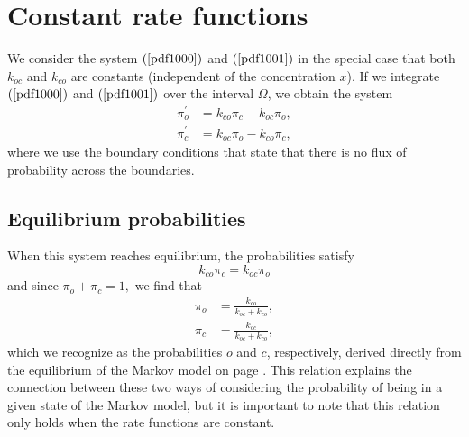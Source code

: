 \section{Constant rate functions}
We consider the system $\left(  \ref{pdf1000}\right)$ and $\left(\ref{pdf1001}\right)  $ in the
special case that both $k_{oc}$ and $k_{co}$ are constants (independent of the concentration $x$). If we integrate
$\left(  \ref{pdf1000}\right)$ and $\left(\ref{pdf1001}\right)  $ over the interval $\Omega$, we obtain the system%
\begin{align}
\pi_{o}^{\prime}  &  =k_{co}\pi_{c}-k_{oc}\pi_{o},\label{pi1}\\
\pi_{c}^{\prime}  &  =k_{oc}\pi_{o}-k_{co}\pi_{c}, \label{pi2}%
\end{align}
where we use the boundary conditions that state that there is no flux
of probability across the boundaries.

\subsection{Equilibrium probabilities}


When this system reaches equilibrium, the probabilities satisfy
\begin{equation}
k_{co}\pi_{c}=k_{oc}\pi_{o}%
\end{equation}
and since $\pi_{o}+\pi_{c}=1,$ we find that%
\begin{align}
\pi_{o} &  =\frac{k_{co}}{k_{oc}+k_{co}},\label{eq_po}\\
\pi_{c} &  =\frac{k_{oc}}{k_{oc}+k_{co}},\label{eq_pc}%
\end{align}
which we recognize as the probabilities $o$ and $c$, respectively, derived directly from the
equilibrium of the Markov model on page \pageref{eq_pr_wt}. This relation explains
the connection between these two ways of considering the probability of
being in a given state of the Markov model, but it is important to note that
this relation only holds when the rate functions are constant.

